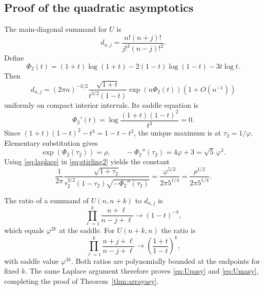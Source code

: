 \documentclass[11pt]{article}
\numberwithin{equation}{section}
\theoremstyle{definition}
\theoremstyle{remark}
\begin{document}
\subsection{Proof of the quadratic asymptotics}
The main-diagonal summand for $U$ is
\[
 d_{n,j}=\frac{n!(n+j)!}{j!^3(n-j)!^2}.
\]
Define
\[
 \Phi_2(t)=(1+t)\log(1+t)-2(1-t)\log(1-t)-3t\log t.
\]
Then
\begin{equation}\label{eq:stirling2}
 d_{n,j}=(2\pi n)^{-3/2}
 \frac{\sqrt{1+t}}{t^{3/2}(1-t)}
 \exp(n\Phi_2(t))(1+O(n^{-1}))
\end{equation}
uniformly on compact interior intervals. Its saddle equation is
\[
 \Phi_2'(t)=\log\frac{(1+t)(1-t)^2}{t^3}=0.
\]
Since $(1+t)(1-t)^2-t^3=1-t-t^2$, the unique maximum is at
$\tau_2=1/\varphi$. Elementary substitution gives
\[
 \exp(\Phi_2(\tau_2))=\rho,\qquad
 -\Phi_2''(\tau_2)=4\varphi+3=\sqrt5\,\varphi^3.
\]
Using \eqref{eq:laplace} in \eqref{eq:stirling2} yields the constant
\[
 \frac1{2\pi}
 \frac{\sqrt{1+\tau_2}}
 {\tau_2^{3/2}(1-\tau_2)\sqrt{-\Phi_2''(\tau_2)}}
 =\frac{\varphi^{5/2}}{2\pi5^{1/4}}
 =\frac{\rho^{1/2}}{2\pi5^{1/4}}.
\]

The ratio of a summand of $U(n,n+k)$ to $d_{n,j}$ is
\[
 \prod_{\ell=1}^k\frac{n+\ell}{n-j+\ell}
 \longrightarrow (1-t)^{-k},
\]
which equals $\varphi^{2k}$ at the saddle. For $U(n+k,n)$ the ratio is
\[
 \prod_{\ell=1}^k\frac{n+j+\ell}{n-j+\ell}
 \longrightarrow\left(\frac{1+t}{1-t}\right)^k,
\]
with saddle value $\varphi^{3k}$.
Both ratios are polynomially bounded at the endpoints for fixed $k$.
The same Laplace argument therefore proves \eqref{eq:Upasy} and
\eqref{eq:Umasy}, completing the proof of
Theorem~\ref{thm:arrayasy}.
\end{document}
